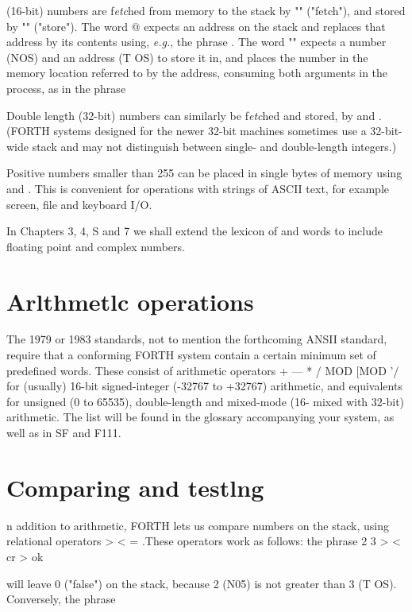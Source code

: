  (16-bit) numbers are f\textit{etc}hed from memory to the stack by "" ("fetch"), and stored by "\bc{!}" ("store"). The word @ expects an address on the stack and replaces that address by its contents using, \textit{e.g.}, the phrase . The word "\regc{!}" expects a number (NOS) and an address (T OS) to store it in, and places the number in the memory location referred to by the address, consuming both arguments in the process, as in the phrase 

Double length (32-bit) numbers can similarly be f\textit{etc}hed and stored, by  and  . (FORTH systems designed for the newer 32-bit machines sometimes use a 32-bit-wide stack and may not distinguish between single- and double-length integers.)

Positive numbers smaller than 255 can be placed in single bytes of memory using  and . This is convenient for operations with strings of ASCII text, for example screen, file and keyboard I/O.

In Chapters 3, 4, S and 7 we shall extend the lexicon of  and \regc{!} words to include floating point and complex numbers.

\section{Arlthmetlc operations}

The 1979 or 1983 standards, not to mention the forthcoming ANSII standard, require that a conforming FORTH system contain a certain minimum set of predefined words. These consist of arithmetic operators + — * / MOD [MOD '/ for (usually) 16-bit signed-integer (-32767 to +32767) arithmetic, and equivalents for unsigned (0 to 65535), double-length and mixed-mode (16- mixed with 32-bit) arithmetic. The list will be found in the glossary accompanying your system, as well as in SF and F111.

\section{Comparing and testlng}

n addition to arithmetic, FORTH lets us compare numbers on the stack, using relational operators > < = .These operators work as follows: the phrase
2 3 > < cr > ok

will leave 0 ("false") on the stack, because 2 (N05) is not greater
than 3 (T OS). Conversely, the phrase

